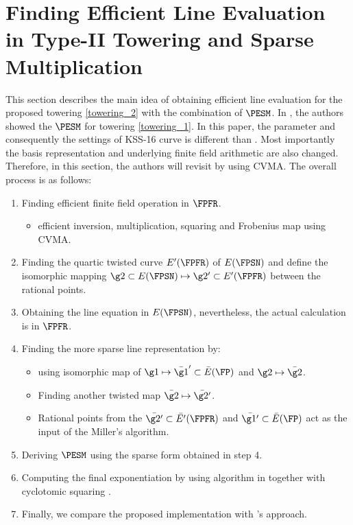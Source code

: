 \section{Finding Efficient Line Evaluation in Type-II Towering and Sparse Multiplication}
\label{sec:3}
This section describes the main idea of obtaining efficient line evaluation for the proposed towering \eqref{towering_2} with the combination of $\PESM$.
In \cite{self_indo17}, the authors showed the $\PESM$ for towering \eqref{towering_1}. 
In this paper, the parameter and consequently the settings of KSS-16 curve is different than \cite{self_indo17}. 
Most importantly the basis representation and underlying finite field arithmetic are also changed. 
Therefore, in this section, the authors will revisit \cite{self_indo17} by using CVMA.
The overall process is as follows:
\begin{enumerate}
	\item Finding efficient finite field operation in $\FPFR$.
	\begin{itemize}
		\item efficient  inversion, multiplication, squaring and Frobenius map using CVMA.
	\end{itemize}
	\item Finding the quartic twisted curve $E'(\FPFR)$ of $E(\FPSN)$ and define the isomorphic mapping $\g2 \subset E(\FPSN) \mapsto \g2' \subset E'(\FPFR)$ between the rational points.
	\item Obtaining the line equation in $E(\FPSN)$, nevertheless, the actual calculation is in $\FPFR$.
	\item Finding the more sparse line representation by:
		\begin{itemize}
		\item using isomorphic map of $\g1 \mapsto \bar{\g1}' \subset \bar{E}(\FP)$ and $\g2 \mapsto \bar{\g2}$.
		\item Finding another twisted map $\bar{\g2} \mapsto \bar{\g2'}$. 
		\item Rational points from the $\bar{\g2'} \subset \bar{E'}(\FPFR)$  and $\bar{\g1'} \subset \bar{E}(\FP)$ act as the input of the Miller's algorithm.
	\end{itemize}
	\item Deriving $\PESM$ using the sparse form obtained in step 4.
	\item Computing the final exponentiation by using algorithm in \cite{loubna_kss16} together with cyclotomic squaring \cite{cyclotomic_sqr}.
	\item  Finally, we compare the proposed implementation with \cite{self_indo17}'s approach.
\end{enumerate}
